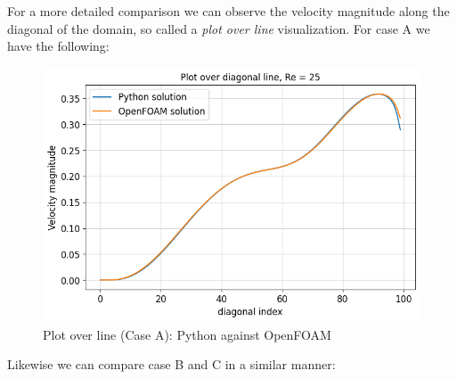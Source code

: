 \documentclass[10pt]{report}
\begin{document}
For a more detailed comparison we can observe the velocity magnitude along the diagonal of the domain,
so called a \textit{plot over line} visualization. For case A we have the following:
\begin{figure}[H]
    \centering
    \includegraphics[width = \textwidth]{plots/overline_RE25.png}
    \caption{Plot over line (Case A): Python against OpenFOAM}
\end{figure}
Likewise we can compare case B and C in a similar manner:
\end{document}
